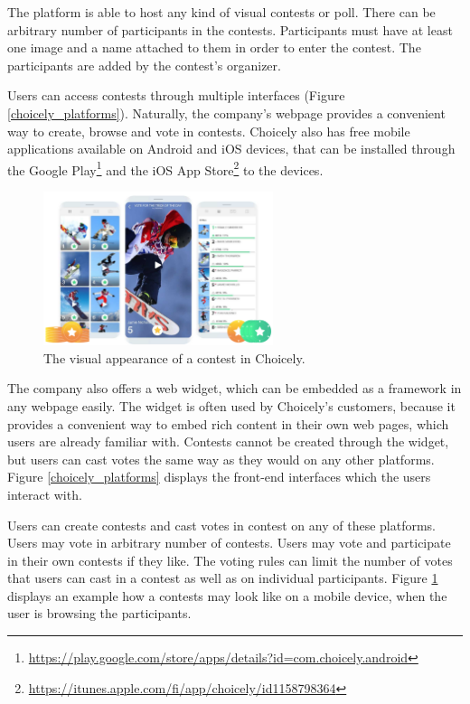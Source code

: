     The platform is able to host any kind of visual contests or poll. There can be arbitrary number of participants in the contests. Participants must have at least one image and a name attached to them in order to enter the contest. The participants are added by the contest's organizer. 

    Users can access contests through multiple interfaces (Figure \ref{choicely_platforms}). Naturally, the company's webpage provides a convenient way to create, browse and vote in contests. Choicely also has free mobile applications available on Android and iOS devices, that can be installed through the Google Play\footnote{\url{https://play.google.com/store/apps/details?id=com.choicely.android}} and the iOS App Store\footnote{\url{https://itunes.apple.com/fi/app/choicely/id1158798364}} to the devices. 
    
    \begin{figure}[h] 
        \begin{center}
            \includegraphics[width=0.6\textwidth]{images/vote_trick_of_the_day.png}
            \caption{The visual appearance of a contest in Choicely.}
            \label{vote_trick_of_the_day}
        \end{center}
    \end{figure}

    The company also offers a web widget, which can be embedded as a framework in any webpage easily. The widget is often used by Choicely's customers, because it provides a convenient way to embed rich content in their own web pages, which users are already familiar with. Contests cannot be created through the widget, but users can cast votes the same way as they would on any other platforms. Figure \ref{choicely_platforms} displays the front-end interfaces which the users interact with.
    
    Users can create contests and cast votes in contest on any of these platforms. Users may vote in arbitrary number of contests. Users may vote and participate in their own contests if they like. The voting rules can limit the number of votes that users can cast in a contest as well as on individual participants. Figure \ref{vote_trick_of_the_day} displays an example how a contests may look like on a mobile device, when the user is browsing the participants. 

